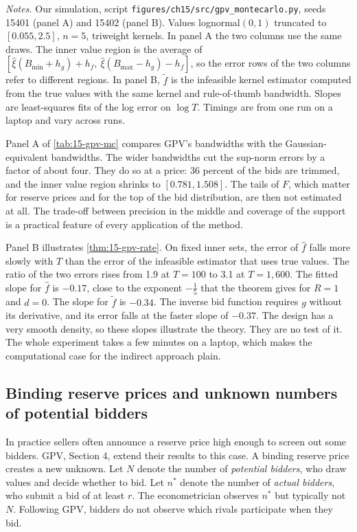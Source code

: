 \begin{table}[htbp]
\smallskip
\begin{minipage}{0.9\textwidth}
\footnotesize
\textit{Notes.} Our simulation, script \texttt{figures/ch15/src/gpv\_montecarlo.py}, seeds 15401 (panel A) and 15402 (panel B). Values lognormal$(0,1)$ truncated to $[0.055,2.5]$, $n=5$, triweight kernels. In panel A the two columns use the same draws. The inner value region is the average of $[\hat\xi(B_{\min}+h_g)+h_f,\ \hat\xi(B_{\max}-h_g)-h_f]$, so the error rows of the two columns refer to different regions. In panel B, $\tilde f$ is the infeasible kernel estimator computed from the true values with the same kernel and rule-of-thumb bandwidth. Slopes are least-squares fits of the log error on $\log T$. Timings are from one run on a laptop and vary across runs.
\end{minipage}
\end{table}

Panel A of \cref{tab:15-gpv-mc} compares GPV's bandwidths with the Gaussian-equivalent bandwidths. The wider bandwidths cut the sup-norm errors by a factor of about four. They do so at a price: 36 percent of the bids are trimmed, and the inner value region shrinks to $[0.781,1.508]$. The tails of $F$, which matter for reserve prices and for the top of the bid distribution, are then not estimated at all. The trade-off between precision in the middle and coverage of the support is a practical feature of every application of the method.

Panel B illustrates \cref{thm:15-gpv-rate}. On fixed inner sets, the error of $\hat f$ falls more slowly with $T$ than the error of the infeasible estimator that uses true values. The ratio of the two errors rises from 1.9 at $T=100$ to 3.1 at $T=1{,}600$. The fitted slope for $\hat f$ is $-0.17$, close to the exponent $-\frac15$ that the theorem gives for $R=1$ and $d=0$. The slope for $\tilde f$ is $-0.34$. The inverse bid function requires $g$ without its derivative, and its error falls at the faster slope of $-0.37$. The design has a very smooth density, so these slopes illustrate the theory. They are no test of it. The whole experiment takes a few minutes on a laptop, which makes the computational case for the indirect approach plain.

\subsection{Binding reserve prices and unknown numbers of potential bidders}\label{sec:15-gpv-reserve}

In practice sellers often announce a reserve price high enough to screen out some bidders. GPV, Section 4, extend their results to this case. A binding reserve price creates a new unknown. Let $N$ denote the number of \emph{potential bidders}, who draw values and decide whether to bid. Let $n^*$ denote the number of \emph{actual bidders}, who submit a bid of at least $r$. The econometrician observes $n^*$ but typically not $N$. Following GPV, bidders do not observe which rivals participate when they bid.

